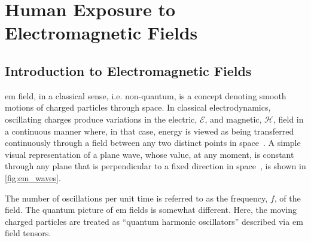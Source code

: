 \chapter{Human Exposure to Electromagnetic Fields}
\label{chap:human-exposure-to-emfs}

\section{Introduction to Electromagnetic Fields}
\Gls{em} field, in a classical sense, i.e. non-quantum, is a concept denoting smooth motions of charged particles through space.
In classical electrodynamics, oscillating charges produce variations in the electric, $\mathcal{E}$, and magnetic, $\mathcal{H}$, field in a continuous manner where, in that case, energy is viewed as being transferred continuously through a field between any two distinct points in space~\cite{Griffiths2017Introduction}.
A simple visual representation of a plane wave, whose value, at any moment, is constant through any plane that is perpendicular to a fixed direction in space~\cite{Brekhovskikh1980Waves}, is shown in \cref{fig:em_waves}.

The number of oscillations per unit time is referred to as the frequency, $f$, of the field.
The quantum picture of \gls{em} fields is somewhat different.
Here, the moving charged particles are treated as ``quantum harmonic oscillators'' described via \gls{em} field tensors.

